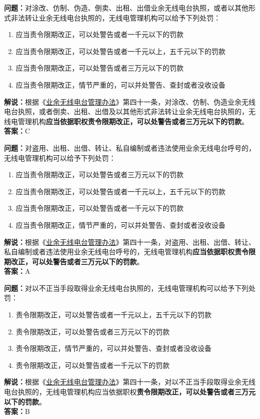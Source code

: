 \textbf{问题：}对涂改、仿制、伪造、倒卖、出租、出借业余无线电台执照，或者以其他形式非法转让业余无线电台执照的，无线电管理机构可以给予下列处罚：
\begin{enumerate}[label=\Alph*), leftmargin=1.5cm] 
  \item 应当责令限期改正，可以处警告或者一千元以下的罚款
  \item 应当责令限期改正，可以处警告或者一千元以上，五千元以下的罚款
  \item 应当责令限期改正，可以处警告或者三万元以下的罚款
  \item 应当责令限期改正，情节严重的，可以并处警告、查封或者没收设备
\end{enumerate}
\textbf{解说：}根据《\href{https://www.miit.gov.cn/jgsj/zfs/bmgz/art/2020/art_147b69815b3641caad9047735f94c860.html}{业余无线电台管理办法}》第四十一条，对涂改、仿制、伪造业余无线电台执照，或者倒卖、出租、出借及以其他形式非法转让业余无线电台执照的，无线电管理机构\textbf{应当依据职权责令限期改正，可以处警告或者三万元以下的罚款}。\\
\textbf{答案：}C


\textbf{问题：}对盗用、出租、出借、转让、私自编制或者违法使用业余无线电台呼号的，无线电管理机构可以给予下列处罚：
\begin{enumerate}[label=\Alph*), leftmargin=1.5cm]
  \item 应当责令限期改正，可以处警告或者三万元以下的罚款
  \item 应当责令限期改正，可以处警告或者一千元以上，五千元以下的罚款
  \item 应当责令限期改正，可以处警告或者一千元以下的罚款
  \item 应当责令限期改正，情节严重的，可以并处警告、查封或者没收设备
\end{enumerate}
\textbf{解说：}根据《\href{https://www.miit.gov.cn/jgsj/zfs/bmgz/art/2020/art_147b69815b3641caad9047735f94c860.html}{业余无线电台管理办法}》第四十一条，对盗用、出租、出借、转让、私自编制或者违法使用业余无线电台呼号的，无线电管理机构\textbf{应当依据职权责令限期改正，可以处警告或者三万元以下的罚款}。\\
\textbf{答案：}A


\textbf{问题：}对以不正当手段取得业余无线电台执照的，无线电管理机构可以给予下列处罚：
\begin{enumerate}[label=\Alph*), leftmargin=1.5cm]
  \item 责令限期改正，可以处警告或者一千元以上，五千元以下的罚款
  \item 责令限期改正，可以处警告或者三万元以下的罚款
  \item 责令限期改正，情节严重的，可以并处警告、查封或者没收设备
  \item 责令限期改正，可以处警告或者一千元以下的罚款
\end{enumerate}
\textbf{解说：}根据《\href{https://www.miit.gov.cn/jgsj/zfs/bmgz/art/2020/art_147b69815b3641caad9047735f94c860.html}{业余无线电台管理办法}》第四十一条，对以不正当手段取得业余无线电台执照的，无线电管理机构应当依据职权\textbf{责令限期改正，可以处警告或者三万元以下的罚款}。\\
\textbf{答案：}B


